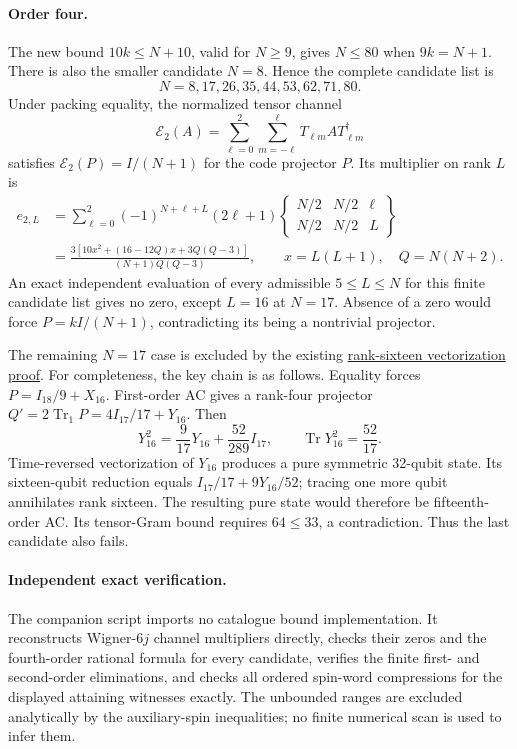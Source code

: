 \documentclass{article}
\begin{document}
\paragraph{Order four.}
The new bound $10k\le N+10$, valid for $N\ge9$, gives $N\le80$
when $9k=N+1$. There is also the smaller candidate $N=8$.
Hence the complete candidate list is
\[
N=8,17,26,35,44,53,62,71,80.
\]
Under packing equality, the normalized tensor channel
\[
\mathcal E_2(A)=\sum_{\ell=0}^2\sum_{m=-\ell}^{\ell}
 T_{\ell m}A T_{\ell m}^{\dagger}
\]
satisfies $\mathcal E_2(P)=I/(N+1)$ for the code projector $P$.
Its multiplier on rank $L$ is
\begin{align*}
e_{2,L}
&=\sum_{\ell=0}^2(-1)^{N+\ell+L}(2\ell+1)
 \begin{Bmatrix}N/2&N/2&\ell\\N/2&N/2&L\end{Bmatrix}\\
&=\frac{3[10x^2+(16-12Q)x+3Q(Q-3)]}{(N+1)Q(Q-3)},
\qquad x=L(L+1),\quad Q=N(N+2).
\end{align*}
An exact independent evaluation of every admissible $5\le L\le N$
for this finite candidate list gives no zero, except $L=16$ at $N=17$.
Absence of a zero would force $P=kI/(N+1)$, contradicting its being a
nontrivial projector.

The remaining $N=17$ case is excluded by the existing
\href{../n17-t4/proof.tex}{rank-sixteen vectorization proof}.
For completeness, the key chain is as follows. Equality forces
$P=I_{18}/9+X_{16}$. First-order AC gives a rank-four projector
$Q'=2\operatorname{Tr}_1P=4I_{17}/17+Y_{16}$.
Then
\[
Y_{16}^2=\frac9{17}Y_{16}+\frac{52}{289}I_{17},
\qquad \operatorname{Tr}Y_{16}^2=\frac{52}{17}.
\]
Time-reversed vectorization of $Y_{16}$ produces a pure symmetric
32-qubit state. Its sixteen-qubit reduction equals
$I_{17}/17+9Y_{16}/52$; tracing one more qubit annihilates rank sixteen.
The resulting pure state would therefore be fifteenth-order AC.
Its tensor-Gram bound requires $64\le33$, a contradiction.
Thus the last candidate also fails.

\paragraph{Independent exact verification.}
The companion script imports no catalogue bound implementation.
It reconstructs Wigner-$6j$ channel multipliers directly, checks their
zeros and the fourth-order rational formula for every candidate, verifies
the finite first- and second-order eliminations, and checks all ordered
spin-word compressions for the displayed attaining witnesses exactly.
The unbounded ranges are excluded analytically by the auxiliary-spin
inequalities; no finite numerical scan is used to infer them.
\end{document}
